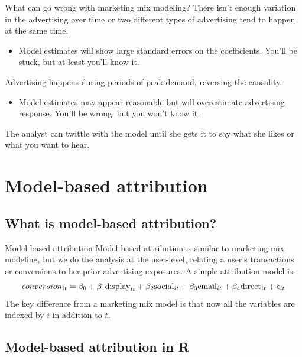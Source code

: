 \documentclass[10pt, aspectratio=169]{beamer}
\begin{document}
\begin{frame}{What can go wrong with marketing mix modeling?}
There isn't enough variation in the advertising over time or two different types of advertising tend to happen at the same time. \\
\begin{itemize}
\item Model estimates will show large standard errors on the coefficients.  You'll be stuck, but at least you'll know it. 
\end{itemize}
\pause
Advertising happens during periods of peak demand, reversing the causality. \\
\begin{itemize}
\item Model estimates may appear reasonable but will overestimate advertising response.  You'll be wrong, but you won't know it. 
\end{itemize}
\pause 
The analyst can twittle with the model until she gets it to say what she likes or what you want to hear. 
\end{frame} 

\section{Model-based attribution}

\subsection{What is model-based attribution?}

\begin{frame}{Model-based attribution}
\alert{Model-based attribution} is similar to marketing mix modeling, but we do the analysis at the user-level, relating a user's transactions or conversions to her prior advertising exposures.  A simple attribution model is: 
\begin{equation*}
conversion_{it} = \beta_0 + \beta_1 \textnormal{display}_{it} + \beta_2 \textnormal{social}_{it} + \beta_3 \textnormal{email}_{it} + \beta_4 \textnormal{direct}_{it} + \epsilon_{it}
\end{equation*} 
The key difference from a marketing mix model is that now all the variables are \alert{indexed by $i$} in addition to $t$.
\end{frame}

\subsection{Model-based attribution in R}
\end{document}
